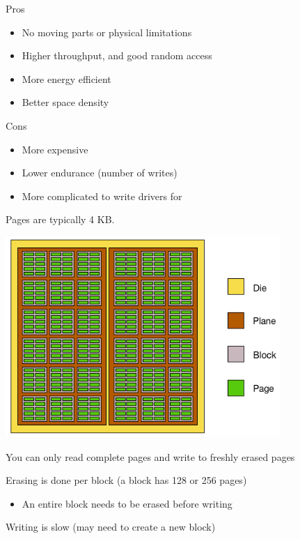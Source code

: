 \begin{slide}
  

    Pros
    \begin{itemize}
        \item No moving parts or physical limitations
        \item Higher throughput, and good random access
        \item More energy efficient
        \item Better space density
    \end{itemize}
    \medskip

    Cons
    \begin{itemize}
        \item More expensive
        \item Lower endurance (number of writes)
        \item More complicated to write drivers for
    \end{itemize}

\end{slide}

\begin{slide}
  

    Pages are typically 4 KB.

    \includegraphics[height=0.65\textheight]{ssd.png} 

\end{slide}


\begin{slide}
  

    You can only read complete pages and write to freshly erased pages
    \bigskip

    Erasing is done per block (a block has 128 or 256 pages)
    \begin{itemize}
        \item An entire block needs to be erased before writing
    \end{itemize}
    \bigskip

    Writing is slow (may need to create a new block)

\end{slide}

